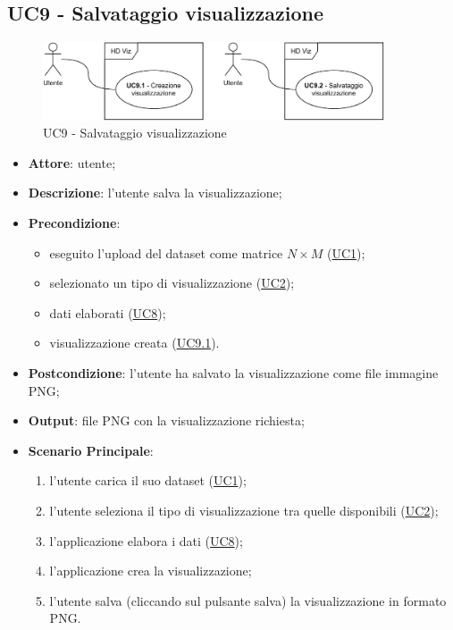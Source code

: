\subsection{UC9 - Salvataggio visualizzazione}
    \label{uc9}
    
    \begin{figure}[htbp]
        \centering
        \includegraphics[width=0.9\textwidth]{source/sections/casi-uso/diagrams/uc9.pdf}
        \caption{UC9 - Salvataggio visualizzazione}
        \label{fig:uc9}
    \end{figure}


    \begin{itemize}
    \item \textbf{Attore}: utente;
    \item \textbf{Descrizione}: l'utente salva la visualizzazione;
    \item \textbf{Precondizione}: 
    \begin{itemize}
        \item eseguito l'upload del dataset come matrice $N\times M$ (\hyperref[uc1]{UC1});
        \item selezionato un tipo di visualizzazione (\hyperref[uc2]{UC2});
        \item dati elaborati (\hyperref[uc8]{UC8});
        \item visualizzazione creata (\hyperref[uc9.1]{UC9.1}).
    \end{itemize}  
    \item \textbf{Postcondizione}: l'utente ha salvato la visualizzazione come file immagine PNG;
    \item \textbf{Output}: file PNG con la visualizzazione richiesta;
    \item \textbf{Scenario Principale}: 
    \begin{enumerate}
        \item l'utente carica il suo dataset (\hyperref[uc1]{UC1});
        \item l'utente seleziona il tipo di visualizzazione tra quelle disponibili (\hyperref[uc2]{UC2});
        \item l'applicazione elabora i dati (\hyperref[uc8]{UC8});
        \item l'applicazione crea la visualizzazione;
        \item l'utente salva (cliccando sul pulsante salva) la visualizzazione in formato PNG.
    \end{enumerate}
    \end{itemize}